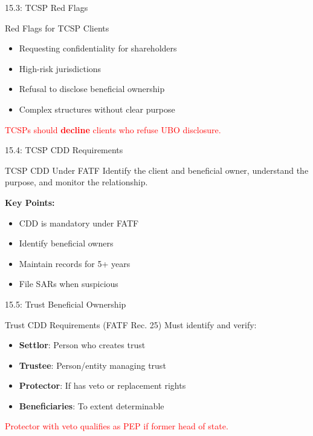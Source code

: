 \documentclass{beamer}
\begin{document}
	\begin{frame}{15.3: TCSP Red Flags}
		\begin{block}{Red Flags for TCSP Clients}
			\begin{itemize}
				\item Requesting confidentiality for shareholders
				\item High-risk jurisdictions
				\item Refusal to disclose beneficial ownership
				\item Complex structures without clear purpose
			\end{itemize}
		\end{block}
		\textcolor{red}{TCSPs should \textbf{decline} clients who refuse UBO disclosure.}
	\end{frame}
	
	\begin{frame}{15.4: TCSP CDD Requirements}
		\begin{block}{TCSP CDD Under FATF}
			Identify the client and beneficial owner, understand the purpose, and monitor the relationship.
		\end{block}
		\textbf{Key Points:}
		\begin{itemize}
			\item CDD is mandatory under FATF
			\item Identify beneficial owners
			\item Maintain records for 5+ years
			\item File SARs when suspicious
		\end{itemize}
	\end{frame}
	
	\begin{frame}{15.5: Trust Beneficial Ownership}
		\begin{block}{Trust CDD Requirements (FATF Rec. 25)}
			Must identify and verify:
			\begin{itemize}
				\item \textbf{Settlor}: Person who creates trust
				\item \textbf{Trustee}: Person/entity managing trust
				\item \textbf{Protector}: If has veto or replacement rights
				\item \textbf{Beneficiaries}: To extent determinable
			\end{itemize}
		\end{block}
		\textcolor{red}{Protector with veto qualifies as PEP if former head of state.}
	\end{frame}
	
\end{document}
